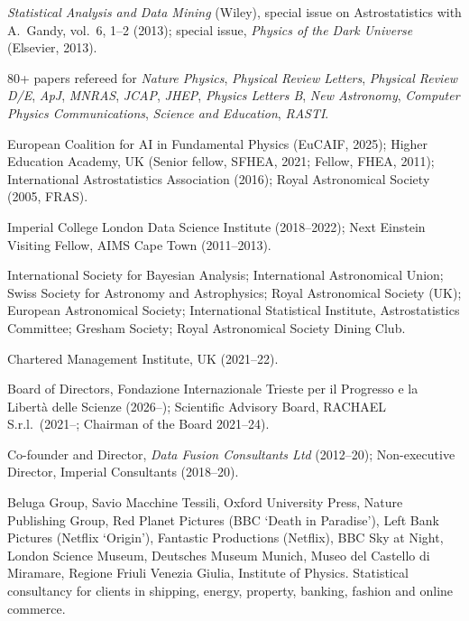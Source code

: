 {\itshape Statistical Analysis and Data Mining} (Wiley), special issue on Astrostatistics with A.~Gandy, vol.~6, 1–2 (2013); special issue, {\itshape Physics of the Dark Universe} (Elsevier, 2013).

80+ papers refereed for {\itshape Nature Physics}, {\itshape Physical Review Letters}, {\itshape Physical Review D/E}, {\itshape ApJ}, {\itshape MNRAS}, {\itshape JCAP}, {\itshape JHEP}, {\itshape Physics Letters B}, {\itshape New Astronomy}, {\itshape Computer Physics Communications}, {\itshape Science and Education}, {\itshape RASTI}.




European Coalition for AI in Fundamental Physics (EuCAIF, 2025); Higher Education Academy, UK (Senior fellow, SFHEA, 2021; Fellow, FHEA, 2011); International Astrostatistics Association (2016); Royal Astronomical Society (2005, FRAS).

Imperial College London Data Science Institute (2018–2022); Next Einstein Visiting Fellow, AIMS Cape Town (2011–2013).

International Society for Bayesian Analysis; International Astronomical Union; Swiss Society for Astronomy and Astrophysics; Royal Astronomical Society (UK); European Astronomical Society; International Statistical Institute, Astrostatistics Committee; Gresham Society; Royal Astronomical Society Dining Club.

Chartered Management Institute, UK (2021–22).





Board of Directors, Fondazione Internazionale Trieste per il Progresso e la Libert\`a delle Scienze (2026–);  Scientific Advisory Board, RACHAEL S.r.l.\ (2021–; Chairman of the Board 2021–24).

Co-founder and Director, {\itshape Data Fusion Consultants Ltd} (2012–20); Non-executive Director, Imperial Consultants (2018–20).

Beluga Group, Savio Macchine Tessili, Oxford University Press, Nature Publishing Group, Red Planet Pictures (BBC `Death in Paradise'), Left Bank Pictures (Netflix `Origin'), Fantastic Productions (Netflix), BBC Sky at Night, London Science Museum, Deutsches Museum Munich, Museo del Castello di Miramare, Regione Friuli Venezia Giulia, Institute of Physics. Statistical consultancy for clients in shipping, energy, property, banking, fashion and online commerce.

